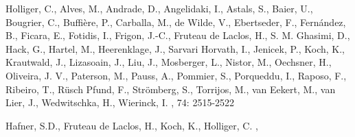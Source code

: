 \documentclass[]{article}
\begin{document}
\begin{thebibliography}{1}

Holliger, C., Alves, M., Andrade, D., Angelidaki, I., Astals, S., Baier, U., Bougrier, C., Buffi{\`e}re, P., Carballa, M., de Wilde, V., Ebertseder, F., Fern{\'a}ndez, B., Ficara, E., Fotidis, I., Frigon, J.-C., Fruteau de Laclos, H., S. M. Ghasimi, D., Hack, G., Hartel, M., Heerenklage, J., Sarvari Horvath, I., Jenicek, P., Koch, K., Krautwald, J., Lizasoain, J., Liu, J., Mosberger, L., Nistor, M., Oechsner, H., Oliveira, J. V., Paterson, M., Pauss, A., Pommier, S., Porqueddu, I., Raposo, F., Ribeiro, T., R{\"u}sch Pfund, F., Str{\"o}mberg, S., Torrijos, M., van Eekert, M., van Lier, J., Wedwitschka, H., Wierinck, I.
,
 74: 2515-2522

  Hafner, S.D., Fruteau de Laclos, H., Koch, K., Holliger, C.
,

\end{thebibliography}
\end{document}
